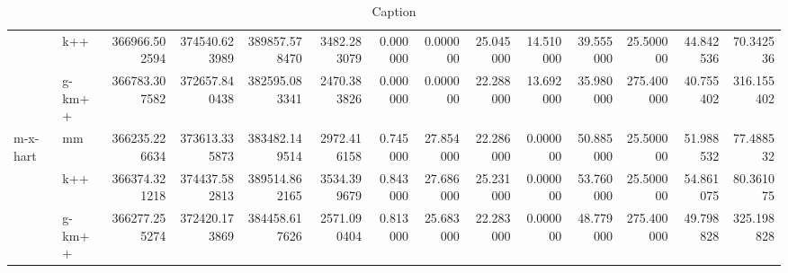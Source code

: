 \begin{table}[!ht]
{\begin{tabular}{llrrrrrrrrrrrr}
 & k++ & 366966.502594 & 374540.623989 & 389857.578470 & 3482.283079 & 0.000000 & 0.000000 & 25.045000 & 14.510000 & 39.555000 & 25.500000 & 44.842536 & 70.342536 \\
 & g-km++ & 366783.307582 & 372657.840438 & 382595.083341 & 2470.383826 & 0.000000 & 0.000000 & 22.288000 & 13.692000 & 35.980000 & 275.400000 & 40.755402 & 316.155402 \\
\cline{1-14}
\multirow[t]{3}{*}{m-x-hart} & mm & 366235.226634 & 373613.335873 & 383482.149514 & 2972.416158 & 0.745000 & 27.854000 & 22.286000 & 0.000000 & 50.885000 & 25.500000 & 51.988532 & 77.488532 \\
 & k++ & 366374.321218 & 374437.582813 & 389514.862165 & 3534.399679 & 0.843000 & 27.686000 & 25.231000 & 0.000000 & 53.760000 & 25.500000 & 54.861075 & 80.361075 \\
 & g-km++ & 366277.255274 & 372420.173869 & 384458.617626 & 2571.090404 & 0.813000 & 25.683000 & 22.283000 & 0.000000 & 48.779000 & 275.400000 & 49.798828 & 325.198828 \\
\cline{1-14}
\hline
\end{tabular}
}

\caption{Caption}
\label{tab:my_label}
\end{table}